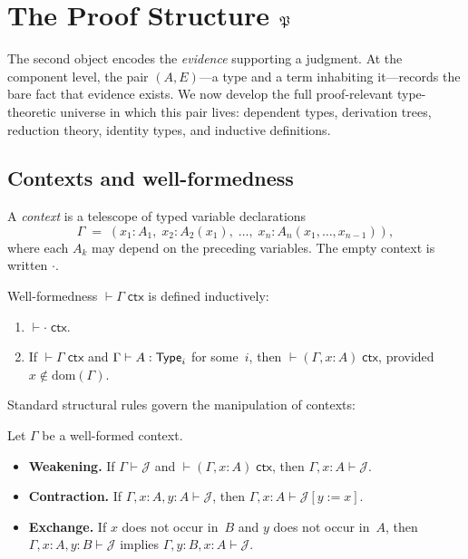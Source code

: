 \chapter{The Proof Structure \texorpdfstring{$\mathfrak{P}$}{P}}
\label{ch:pstr}

The second object encodes the \emph{evidence} supporting a judgment.
At the component level, the pair $(A,E)$---a type and a term inhabiting
it---records the bare fact that evidence exists.  We now develop the
full proof-relevant type-theoretic universe in which this pair lives:
dependent types, derivation trees, reduction theory,
identity types, and inductive definitions.

\section{Contexts and well-formedness}
\label{sec:contexts}

\begin{definition}[Context]
\label{def:context}
A \emph{context} is a telescope of typed variable declarations
\[
  \Gamma \;=\; (x_1 : A_1,\; x_2 : A_2(x_1),\;
  \ldots,\; x_n : A_n(x_1,\ldots,x_{n-1})),
\]
where each $A_k$ may depend on the preceding variables.  The empty
context is written $\cdot$.
\end{definition}

\begin{definition}
Well-formedness $\vdash \Gamma \;\mathsf{ctx}$ is defined inductively:
\begin{enumerate}[label=(\alph*),nosep]
\item $\vdash \cdot \;\mathsf{ctx}$.
\item If $\vdash \Gamma \;\mathsf{ctx}$ and
  $\Gamma \vdash A : \mathsf{Type}_i$ for some~$i$, then
  $\vdash (\Gamma, x : A) \;\mathsf{ctx}$, provided
  $x \notin \mathrm{dom}(\Gamma)$.
\end{enumerate}
\end{definition}

Standard structural rules govern the manipulation of contexts:

\begin{definition}
\label{def:structural}
Let $\Gamma$ be a well-formed context.
\begin{itemize}[nosep]
\item \textbf{Weakening.} If $\Gamma \vdash \mathcal{J}$ and
  $\vdash (\Gamma, x:A) \;\mathsf{ctx}$, then
  $\Gamma, x:A \vdash \mathcal{J}$.
\item \textbf{Contraction.} If $\Gamma, x:A, y:A \vdash \mathcal{J}$,
  then $\Gamma, x:A \vdash \mathcal{J}[y := x]$.
\item \textbf{Exchange.} If $x$ does not occur in~$B$ and $y$ does not
  occur in~$A$, then $\Gamma, x:A, y:B \vdash \mathcal{J}$ implies
  $\Gamma, y:B, x:A \vdash \mathcal{J}$.
\end{itemize}
\end{definition}

